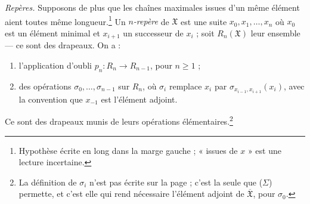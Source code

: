 \documentclass[11pt,a4paper]{article}
\begin{document}

\emph{Repères.} Supposons de plus que les chaînes maximales issues d'un même
élément aient toutes même longueur.\footnote{Hypothèse écrite en long dans la
marge gauche ; « issues de $x$ » est une lecture incertaine.} Un
\emph{$n$-repère} de $\mathfrak{X}$ est une suite $x_{0}, x_{1}, \ldots, x_{n}$
où $x_{0}$ est un élément minimal et $x_{i+1}$ un successeur de $x_{i}$ ; soit
$R_{n}(\mathfrak{X})$ leur ensemble --- ce sont des drapeaux. On a :
\begin{enumerate}
\item[a)] l'application d'oubli $p_{n} : R_{n} \to R_{n-1}$, pour $n \geq 1$ ;
\item[b)] des opérations $\sigma_{0}, \ldots, \sigma_{n-1}$ sur $R_{n}$, où
$\sigma_{i}$ remplace $x_{i}$ par $\sigma_{x_{i-1}, x_{i+1}}(x_{i})$, avec la
convention que $x_{-1}$ est l'élément adjoint.
\end{enumerate}
Ce sont des drapeaux munis de leurs opérations élémentaires.\footnote{La définition de $\sigma_{i}$ n'est pas écrite sur la page ; c'est la
seule que ($\Sigma$) permette, et c'est elle qui rend nécessaire l'élément
adjoint de $\overline{\mathfrak{X}}$, pour $\sigma_{0}$.}
\end{document}
